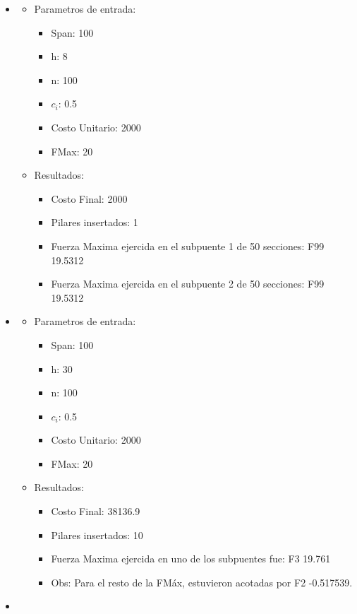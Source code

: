 \begin{itemize}
\item
  \begin{itemize}
    \item Parametros de entrada:
	  \begin{itemize}
	    \item Span: 100
	    \item h: 8
	    \item n: 100
	    \item $c_i$: 0.5
	    \item Costo Unitario: 2000
	    \item FMax: 20
	  \end{itemize}
      \item Resultados:
	  \begin{itemize}
	    \item Costo Final: 2000
	    \item Pilares insertados: 1
	    \item Fuerza Maxima ejercida en el subpuente 1 de 50 secciones: F99 19.5312
	    \item Fuerza Maxima ejercida en el subpuente 2 de 50 secciones: F99 19.5312
	  \end{itemize}
      \end{itemize}
\item
  \begin{itemize}
    \item Parametros de entrada:
	  \begin{itemize}
	    \item Span: 100
	    \item h: 30
	    \item n: 100
	    \item $c_i$: 0.5
	    \item Costo Unitario: 2000
	    \item FMax: 20
	  \end{itemize}
      \item Resultados:
	  \begin{itemize}
	    \item Costo Final: 38136.9
	    \item Pilares insertados: 10
	    \item Fuerza Maxima ejercida en uno de los subpuentes fue: F3 19.761
	    \item Obs: Para el resto de la FM\'ax, estuvieron acotadas por F2 -0.517539.
	  \end{itemize}
      \end{itemize}
\item

\end{itemize}
